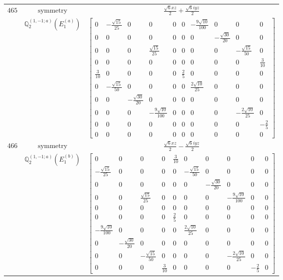 \documentclass[fleqn,8pt,landscape]{jsarticle}
\begin{document}
\begin{longtable}{ccc}
$ 465 $ & $ \text{symmetry} $ & $ \frac{\sqrt{6} x z}{2} + \frac{\sqrt{6} i y z}{2} $ \\
$  $ & $ \mathbb{Q}_{2}^{(1,-1;a)}(E_{1}^{(a)}) $ & $ \begin{bmatrix} 0 & - \frac{\sqrt{15}}{25} & 0 & 0 & 0 & 0 & - \frac{9 \sqrt{10}}{100} & 0 & 0 & 0 \\ 0 & 0 & 0 & 0 & 0 & 0 & 0 & - \frac{\sqrt{30}}{20} & 0 & 0 \\ 0 & 0 & 0 & \frac{\sqrt{15}}{25} & 0 & 0 & 0 & 0 & - \frac{\sqrt{15}}{50} & 0 \\ 0 & 0 & 0 & 0 & 0 & 0 & 0 & 0 & 0 & \frac{3}{10} \\ \frac{3}{10} & 0 & 0 & 0 & 0 & \frac{2}{5} & 0 & 0 & 0 & 0 \\ 0 & - \frac{\sqrt{15}}{50} & 0 & 0 & 0 & 0 & \frac{2 \sqrt{10}}{25} & 0 & 0 & 0 \\ 0 & 0 & - \frac{\sqrt{30}}{20} & 0 & 0 & 0 & 0 & 0 & 0 & 0 \\ 0 & 0 & 0 & - \frac{9 \sqrt{10}}{100} & 0 & 0 & 0 & 0 & - \frac{2 \sqrt{10}}{25} & 0 \\ 0 & 0 & 0 & 0 & 0 & 0 & 0 & 0 & 0 & - \frac{2}{5} \\ 0 & 0 & 0 & 0 & 0 & 0 & 0 & 0 & 0 & 0 \end{bmatrix} $ \\ \hline
$ 466 $ & $ \text{symmetry} $ & $ \frac{\sqrt{6} x z}{2} - \frac{\sqrt{6} i y z}{2} $ \\
$  $ & $ \mathbb{Q}_{2}^{(1,-1;a)}(E_{1}^{(b)}) $ & $ \begin{bmatrix} 0 & 0 & 0 & 0 & \frac{3}{10} & 0 & 0 & 0 & 0 & 0 \\ - \frac{\sqrt{15}}{25} & 0 & 0 & 0 & 0 & - \frac{\sqrt{15}}{50} & 0 & 0 & 0 & 0 \\ 0 & 0 & 0 & 0 & 0 & 0 & - \frac{\sqrt{30}}{20} & 0 & 0 & 0 \\ 0 & 0 & \frac{\sqrt{15}}{25} & 0 & 0 & 0 & 0 & - \frac{9 \sqrt{10}}{100} & 0 & 0 \\ 0 & 0 & 0 & 0 & 0 & 0 & 0 & 0 & 0 & 0 \\ 0 & 0 & 0 & 0 & \frac{2}{5} & 0 & 0 & 0 & 0 & 0 \\ - \frac{9 \sqrt{10}}{100} & 0 & 0 & 0 & 0 & \frac{2 \sqrt{10}}{25} & 0 & 0 & 0 & 0 \\ 0 & - \frac{\sqrt{30}}{20} & 0 & 0 & 0 & 0 & 0 & 0 & 0 & 0 \\ 0 & 0 & - \frac{\sqrt{15}}{50} & 0 & 0 & 0 & 0 & - \frac{2 \sqrt{10}}{25} & 0 & 0 \\ 0 & 0 & 0 & \frac{3}{10} & 0 & 0 & 0 & 0 & - \frac{2}{5} & 0 \end{bmatrix} $ \\ \hline

\end{longtable}
\end{document}
